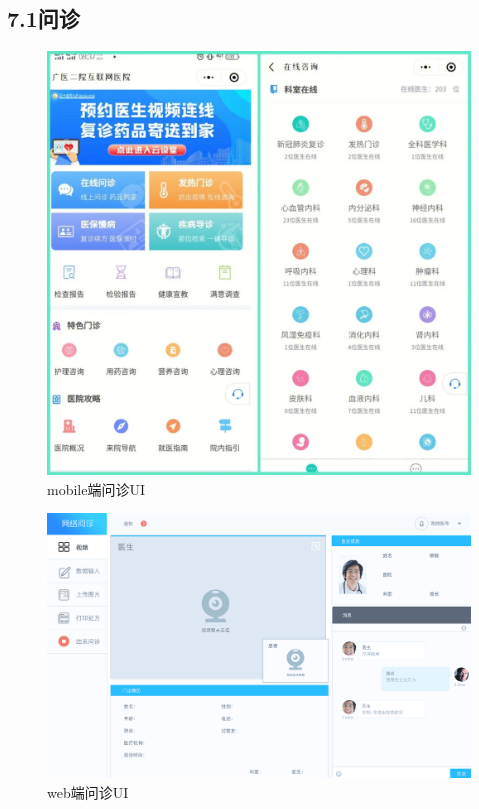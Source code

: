 \documentclass[24pt,a4paper]{article}%
\begin{document}
\subsection*{\songti 7.1问诊}
\begin{figure}[H]
	\centering
	\includegraphics[width=1\textwidth]{./image/wenzhen-1.png}
	\caption*{mobile端问诊UI}
\end{figure}
\begin{figure}[H]
	\centering
	\includegraphics[width=1\textwidth]{./image/wenzhen-2.png}
	\caption*{web端问诊UI}
\end{figure}
\end{document}
